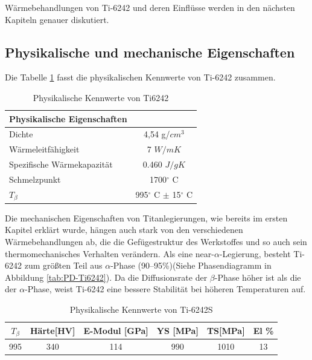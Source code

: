 Wärmebehandlungen von Ti-6242 und deren Einflüsse werden in den nächsten Kapiteln genauer diskutiert.


\subsection{Physikalische und mechanische Eigenschaften}

Die Tabelle \ref{Phy.eig.} fasst die physikalischen Kennwerte von Ti-6242 zusammen.


\begin{table}[H]
	\centering	
	\begin{tabular}{l c}
		
		Physikalische Eigenschaften & \\
		\hline
		Dichte& 4,54 g/$cm^3$\\
		Wärmeleitfähigkeit & 7 $W/mK$ \\
		Spezifische Wärmekapazität & 0.460 $J/gK$\\
		Schmelzpunkt & 1700$^\circ$ C \\
		$T_{\beta}$ &  995$^\circ$ C $\pm$ 15$^\circ$ C \\
		
		\hline
		
	\end{tabular}
	\caption{Physikalische Kennwerte von Ti6242 \cite{DavidBenjamin.19801980} \cite{Davis.1990} \cite{Holt.1997}}
	\label{Phy.eig.}
\end{table}

\pagebreak

Die mechanischen Eigenschaften von Titanlegierungen, wie bereits im ersten Kapitel erklärt wurde, hängen auch stark von den verschiedenen Wärmebehandlungen ab, die die Gefügestruktur des Werkstoffes und so auch sein thermomechanisches Verhalten verändern.
Als eine near-$\alpha$-Legierung, besteht Ti-6242 zum größten Teil aus $\alpha$-Phase (90--95\%)(Siehe Phasendiagramm in Abbildung \ref{tab:PD-Ti6242}). Da die Diffusionsrate der $\beta$-Phase höher ist als die der $\alpha$-Phase, weist Ti-6242 eine bessere Stabilität bei höheren Temperaturen auf. \cite{Prasad.2017} 

\begin{table}[H]
	\centering	
	\begin{tabular}{|c| c| c| c| c| c|}										
		\hline
		$T_{\beta}$ & Härte[HV] & E-Modul [GPa]& YS [MPa]&TS[MPa]& El \% \\
		\hline
		995&340&114&990&1010&13\\
		\hline
	\end{tabular}
	\caption{Physikalische Kennwerte von Ti-6242S \cite{C.Leyens.2005}}
	\label{Mec.}
\end{table}
	
